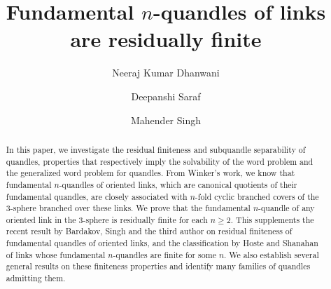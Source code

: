 \documentclass[12pt]{amsart}
\theoremstyle{definition}
\numberwithin{equation}{subsection}
\begin{document}
	\title{Fundamental $n$-quandles of links are residually finite}
	\author{Neeraj Kumar Dhanwani}	
	\author{Deepanshi Saraf}
	\author{Mahender Singh}
	
	\address{Department of Mathematical Sciences, Indian Institute of Science Education and Research (IISER) Mohali, Sector 81,  S. A. S. Nagar, P. O. Manauli, Punjab 140306, India.}

	
	

\begin{abstract}
In this paper, we investigate the residual finiteness and subquandle separability of quandles, properties that respectively imply the solvability of the word problem and the generalized word problem for quandles. From Winker's work, we know that fundamental $n$-quandles of oriented links, which are canonical quotients of their fundamental quandles, are closely associated with $n$-fold cyclic branched covers of the 3-sphere branched over these links. We prove that the fundamental $n$-quandle of any oriented link in the 3-sphere is residually finite for each $n\ge 2$. 
This supplements the recent result by Bardakov, Singh and the third author on residual finiteness of fundamental quandles of oriented links, and the classification by Hoste and Shanahan of links whose fundamental $n$-quandles are finite for some $n$.  We also establish several general results on these finiteness properties and identify many families of quandles admitting them.
\end{abstract}
	
\maketitle
	
\end{document}
